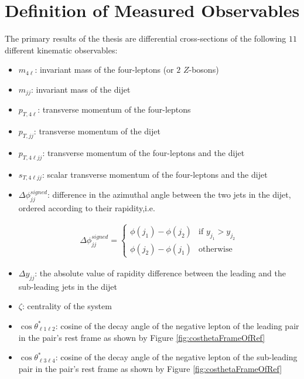\section{Definition of Measured Observables}
\label{sec:Obs}

The primary results of the thesis are differential cross-sections of the following $11$ different kinematic observables:

\begin{itemize}

\item{	$m_{4\ell}$: invariant mass of the four-leptons (or $2$ $Z$-bosons)}
\item{ 	$m_{jj}$:  invariant mass of the dijet}
\item{	$p_{T,4\ell}$: transverse momentum of the four-leptons }
\item{	$p_{T, jj}$: transverse momentum of the dijet }
\item{	$p_{T,4\ell jj}$: transverse momentum of the four-leptons and the dijet }
\item{	$s_{T,4\ell jj}$: scalar transverse momentum of the four-leptons and the dijet }
\item{ 	$\Delta \phi _{jj}^{signed}$: difference in the azimuthal angle between the two jets in the dijet, ordered according to their rapidity,i.e. 

\begin{align*}
	\Delta \phi _{jj}^{signed} = 
	\begin{cases}
	\phi(j_1)-\phi(j_2) & \text{if $y_{j_1} > y_{j_2}$}\\
	\phi(j_2)-\phi(j_1) & \text{otherwise}
	\end{cases} 
\end{align*}
}
\item{ $\Delta y_{jj}$: the absolute value of rapidity difference between the leading and the sub-leading jets in the dijet}
\item{ $\zeta$: centrality of the system}
\item{ $\cos \theta^{*}_{\ell 1 \ell 2}$: cosine of the decay angle of the negative lepton of the leading pair in the pair's rest frame as shown by Figure \ref{fig:costhetaFrameOfRef}}
\item{ $\cos \theta^{*}_{\ell 3 \ell 4}$: cosine of the decay angle of the negative lepton of the sub-leading pair in the pair's rest frame as shown by Figure \ref{fig:costhetaFrameOfRef} }

\end{itemize}

